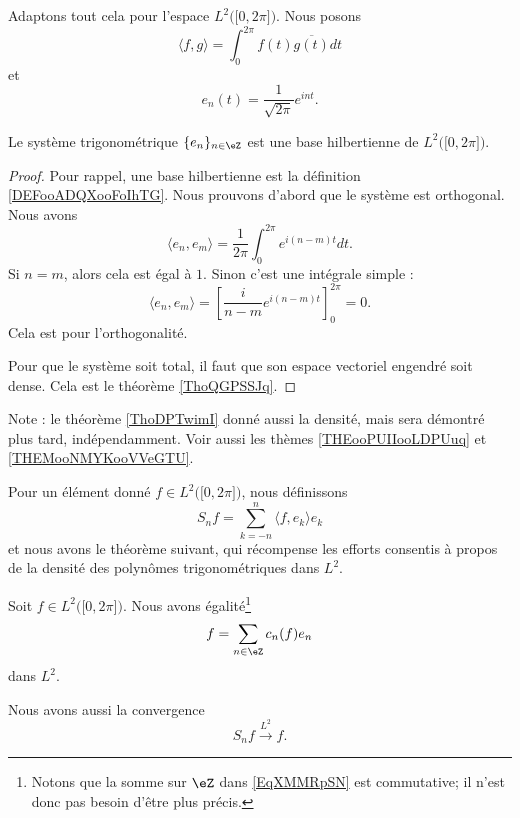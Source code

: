 Adaptons tout cela pour l'espace \( L^2\big( \mathopen[ 0 , 2\pi \mathclose] \big)\). Nous posons
\begin{equation}        \label{EQooBFKDooMkCZOt}
    \langle f, g\rangle =\int_0^{2\pi}f(t)\overline{ g(t) }dt
\end{equation}
et
\begin{equation}        \label{EQooKMYOooLZCNap}
    e_n(t)=\frac{1}{ \sqrt{ 2\pi } } e^{int}.
\end{equation}

\begin{lemma}       \label{LEMooBJDQooLVPczR}
    Le système trigonométrique \( \{ e_n \}_{n\in \eZ}\) est une base hilbertienne de \( L^2\big( \mathopen[ 0 , 2\pi \mathclose] \big)\).
\end{lemma}

\begin{proof}
    Pour rappel, une base hilbertienne est la définition \ref{DEFooADQXooFoIhTG}. Nous prouvons d'abord que le système est orthogonal. Nous avons
    \begin{equation}
        \langle e_n, e_m\rangle =\frac{1}{ 2\pi }\int_0^{2\pi} e^{i(n-m)t}dt.
    \end{equation}
    Si \( n=m\), alors cela est égal à \( 1\). Sinon c'est une intégrale simple : 
    \begin{equation}
        \langle e_n, e_m\rangle =\left[ \frac{ i }{ n-m } e^{i(n-m)t} \right]_0^{2\pi}=0.
    \end{equation}
    Cela est pour l'orthogonalité.

    Pour que le système soit total, il faut que son espace vectoriel engendré soit dense. Cela est le théorème \ref{ThoQGPSSJq}. 
\end{proof}

Note : le théorème \ref{ThoDPTwimI} donné aussi la densité, mais sera démontré plus tard, indépendamment. Voir aussi les thèmes \ref{THEooPUIIooLDPUuq} et \ref{THEMooNMYKooVVeGTU}.

Pour un élément donné \( f\in L^2\big( \mathopen[ 0 , 2\pi \mathclose] \big)\), nous définissons
\begin{equation}
    S_nf=\sum_{k=-n}^n\langle f, e_k\rangle e_k
\end{equation}
et nous avons le théorème suivant, qui récompense les efforts consentis à propos de la densité des polynômes trigonométriques dans \( L^2\).

\begin{theorem} \label{ThoYDKZLyv}
    Soit \( f\in L^2\big( \mathopen[ 0 , 2\pi \mathclose] \big)\). Nous avons égalité\footnote{Notons que la somme sur \( \eZ\) dans \eqref{EqXMMRpSN} est commutative; il n'est donc pas besoin d'être plus précis.}
    \begin{equation}    \label{EqXMMRpSN}
        f=\sum_{n\in \eZ}c_n(f)e_n
    \end{equation}
    dans \( L^2\).

    Nous avons aussi la convergence
\begin{equation}    \label{EqRBWKsYP}
    S_nf\stackrel{L^2}{\to} f.
\end{equation}
\end{theorem}

